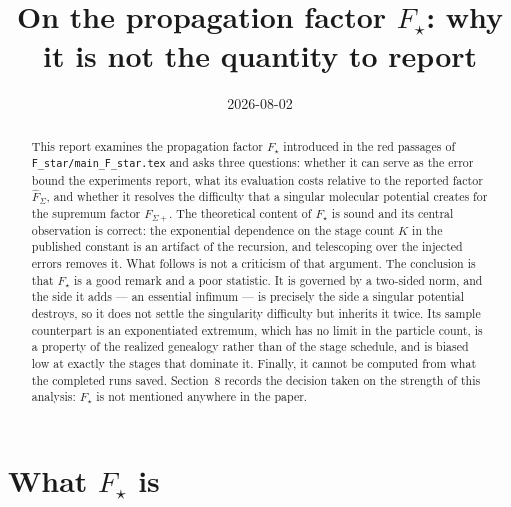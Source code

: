 \documentclass[11pt]{article}
\title{On the propagation factor $F_\star$: why it is not the quantity to report}
\author{}
\date{2026-08-02}
\theoremstyle{plain}
\begin{document}
\maketitle

\begin{abstract}
This report examines the propagation factor $F_\star$ introduced in the red
passages of \texttt{F\_star/main\_F\_star.tex} and asks three questions: whether
it can serve as the error bound the experiments report, what its evaluation
costs relative to the reported factor $\hat F_\Sigma$, and whether it resolves
the difficulty that a singular molecular potential creates for the supremum
factor $F_{\Sigma+}$. The theoretical content of $F_\star$ is sound and its
central observation is correct: the exponential dependence on the stage count
$K$ in the published constant is an artifact of the recursion, and telescoping
over the injected errors removes it. What follows is not a criticism of that
argument. The conclusion is that $F_\star$ is a good remark and a poor
statistic. It is governed by a two-sided norm, and the side it adds --- an
essential infimum --- is precisely the side a singular potential destroys, so
it does not settle the singularity difficulty but inherits it twice. Its
sample counterpart is an exponentiated extremum, which has no limit in the
particle count, is a property of the realized genealogy rather than of the
stage schedule, and is biased low at exactly the stages that dominate it.
Finally, it cannot be computed from what the completed runs saved. Section~8
records the decision taken on the strength of this analysis: $F_\star$ is not
mentioned anywhere in the paper.
\end{abstract}

\section{What $F_\star$ is}
\end{document}
